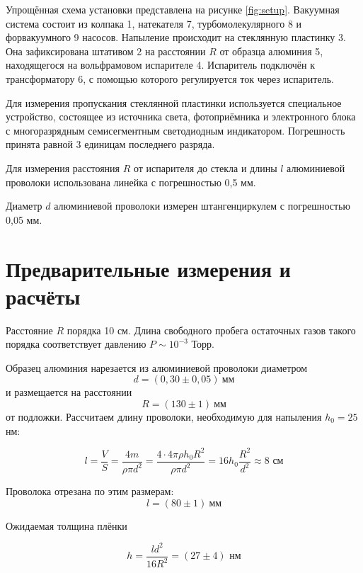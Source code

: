 \documentclass[a4paper, 14pt]{extarticle}
\begin{document}
		\hspace{5mm} Упрощённая схема установки представлена на рисунке \ref{fig:setup}. Вакуумная система состоит из колпака 1, натекателя 7, турбомолекулярного 8 и форвакуумного 9 насосов. Напыление происходит на стеклянную пластинку 3. Она зафиксирована штативом 2 на расстоянии $R$ от образца алюминия 5, находящегося на вольфрамовом испарителе 4. Испаритель подключён к трансформатору 6, с помощью которого регулируется ток через испаритель.
		
		Для измерения пропускания стеклянной пластинки используется специальное устройство, состоящее из источника света, фотоприёмника и электронного блока с многоразрядным семисегментным светодиодным индикатором. Погрешность принята равной 3 единицам последнего разряда.
		
		Для измерения расстояния $R$ от испарителя до стекла и длины $l$ алюминиевой проволоки использована линейка с погрешностью 0,5 мм. 
		
		Диаметр $d$ алюминиевой проволоки измерен штангенциркулем с погрешностью 0,05 мм.
		
		
		
		
	\section{Предварительные измерения и расчёты} 
	
		\hspace{5mm} Расстояние $R$ порядка 10 см. Длина свободного пробега остаточных газов такого порядка соответствует давлению $P \sim 10^{-3}$ Торр.
		
		Образец алюминия нарезается из алюминиевой проволоки диаметром \[ d = (0,30 \pm 0,05) \ \text{мм} \] и размещается на расстоянии \[ R = (130 \pm 1) \ \text{мм} \] от подложки. Рассчитаем длину проволоки, необходимую для напыления $h_0 = 25$ нм:
		
		\begin{equation}
			l = \frac{V}{S} = \dfrac{4m}{\rho\pi d^2} = \frac{4 \cdot 4\pi\rho h_0 R^2}{\rho \pi d^2} = 16 h_0 \frac{R^2}{d^2} \approx 8 \text{ см}
		\end{equation}
		
		Проволока отрезана по этим размерам: \[ l = (80 \pm 1) \ \text{мм} \] 
		
		Ожидаемая толщина плёнки
		
		\begin{equation}
			h =  \frac{l d^2}{16 R^2} = (27 \pm 4)  \text{ нм} 
		\end{equation}
		
\end{document}
